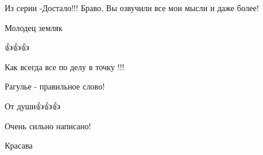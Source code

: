 \begin{itemize}
Из серии -Достало!!! Браво, Вы озвучили все мои мысли и даже более!

 
Молодец земляк

 
👍👍👍

 
Как всегда все по делу в точку !!!

 
Рагулье - правильное слово!

 
От души👍👍👍

 
Очень сильно написано!

 
Красава


\end{itemize}
